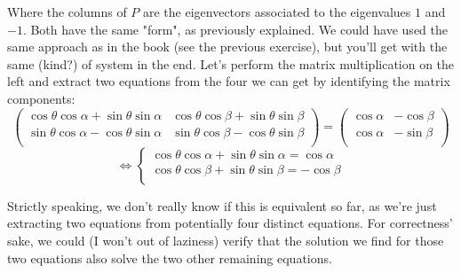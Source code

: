 \documentclass[solutions.tex]{subfiles}
\begin{document}
Where the columns of $P$ are the eigenvectors associated
to the eigenvalues $1$ and $-1$. Both have the same "form", as
previously explained. We could have used the same approach as in
the book (see the previous exercise), but you'll get with the
same (kind?) of system in the end. Let's perform the
matrix multiplication on the left and extract two equations from the
four we can get by identifying the matrix components:
\[
	\begin{pmatrix}
		\cos\theta\cos\alpha + \sin\theta\sin\alpha &
			\cos\theta\cos\beta + \sin\theta\sin\beta \\
		\sin\theta\cos\alpha - \cos\theta\sin\alpha &
			\sin\theta\cos\beta - \cos\theta\sin\beta \\
	\end{pmatrix} = \begin{pmatrix}
		\cos\alpha & -\cos\beta \\
		\cos\alpha & -\sin\beta \\
	\end{pmatrix}
\]
\[
	\Leftrightarrow\begin{cases}
		\cos\theta\cos\alpha + \sin\theta\sin\alpha = \cos\alpha \\
		\cos\theta\cos\beta  + \sin\theta\sin\beta  = -\cos\beta \\
	\end{cases}
\]

\begin{remark} Strictly speaking, we don't really know if this is
equivalent so far, as we're just extracting two equations from
potentially four distinct equations. For correctness' sake, we could
(I won't out of laziness) verify that the solution we find for
those two equations also solve the two other remaining equations.
\end{remark}
\end{document}

